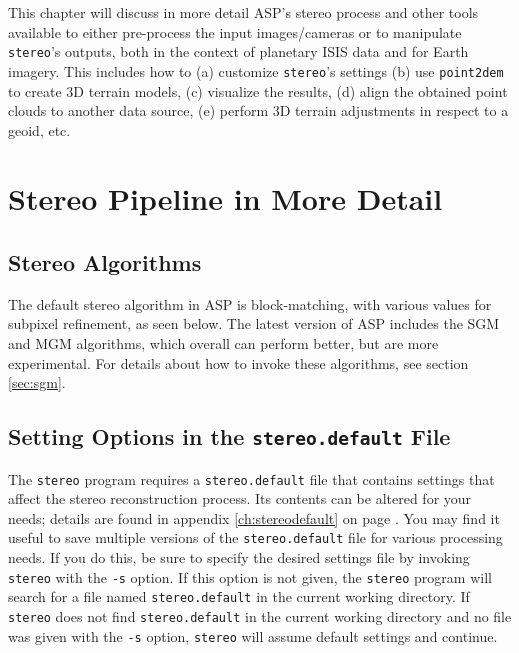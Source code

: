 This chapter will discuss in more detail ASP's stereo process and other
tools available to either pre-process the input images/cameras or to
manipulate \texttt{stereo}'s outputs, both in the context of planetary
ISIS data and for Earth imagery. This includes how to (a) customize
\texttt{stereo}'s settings (b) use \texttt{point2dem} to create 3D
terrain models, (c) visualize the results, (d) align the obtained point
clouds to another data source, (e) perform 3D terrain adjustments in
respect to a geoid, etc.


\section{Stereo Pipeline in More Detail}
\label{running-stereo}

\subsection{Stereo Algorithms}

The default stereo algorithm in ASP is block-matching, with various values for subpixel refinement, as seen below. The latest version of ASP includes the SGM and MGM algorithms, which overall can perform better, but are more experimental. For details about how to invoke these algorithms, see section \ref{sec:sgm}.

\subsection{Setting Options in the \texttt{stereo.default} File}
\label{settingoptionsinstereodefault}

The \texttt{stereo} program requires a \texttt{stereo.default} file that
contains settings that affect the stereo reconstruction process.  Its
contents can be altered for your needs; details are found in appendix
\ref{ch:stereodefault} on page \pageref{ch:stereodefault}.  You may find
it useful to save multiple versions of the \texttt{stereo.default} file
for various processing needs. If you do this, be sure to specify the desired
settings file by invoking \texttt{stereo} with the \texttt{-s}
option.  If this option is not given, the \texttt{stereo} program will
search for a file named \texttt{stereo.default} in the current working
directory. If \texttt{stereo} does not find \texttt{stereo.default} in
the current working directory and no file was given with the \texttt{-s}
option, \texttt{stereo} will assume default settings and continue.

